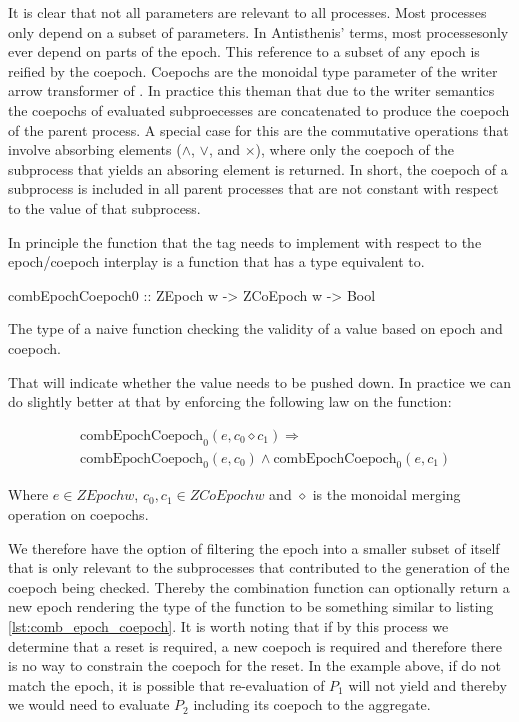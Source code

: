 It is clear that not all parameters are relevant to all processes.
Most processes only depend on a subset of parameters. In Antisthenis'
terms, most processesonly ever depend on parts of the epoch. This
reference to a subset of any epoch is reified by the coepoch. Coepochs
are the monoidal type parameter of the writer arrow transformer of
.  In practice this theman that due to the writer
semantics the coepochs of evaluated subproecesses are concatenated to
produce the coepoch of the parent process. A special case for this are
the commutative operations that involve absorbing elements (\(\land\),
\(\lor\), and \(\times\)), where only the coepoch of the subprocess
that yields an absoring element is returned. In short, the coepoch of
a subprocess is included in all parent processes that are not constant
with respect to the value of that subprocess.

In principle the function that the  tag needs to
implement with respect to the epoch/coepoch interplay is a function
that has a type equivalent to.

\begin{code}
\begin{haskellcode}
combEpochCoepoch0 :: ZEpoch w -> ZCoEpoch w -> Bool
\end{haskellcode}
  \caption{\label{sec:epochs_coepochs}The type of a naive function
    checking the validity of a value based on epoch and coepoch.}
\end{code}

That will indicate whether the value needs to be pushed down. In
practice we can do slightly better at that by enforcing the following
law on the  function:

\begin{align*}
& \text{combEpochCoepoch}_0(e, c_0 \diamond c_1) \Rightarrow \\
& \text{combEpochCoepoch}_0(e,c_0) \land \text{combEpochCoepoch}_0(e,c_1)
\end{align*}

Where \(e \in ZEpoch w\), \(c_0,c_1 \in ZCoEpoch w\) and \(\diamond\)
is the monoidal merging operation on coepochs.

We therefore have the option of filtering the epoch into a smaller
subset of itself that is only relevant to the subprocesses that
contributed to the generation of the coepoch being checked. Thereby
the combination function can optionally return a new epoch rendering
the type of the function to be something similar to listing
\ref{lst:comb_epoch_coepoch}. It is worth noting that if by this
process we determine that a reset is required, a new coepoch is
required and therefore there is no way to constrain the coepoch for
the reset. In the example above, if  do not
match the epoch, it is possible that re-evaluation of \(P_1\) will not
yield  and thereby we would need to evaluate \(P_2\)
including its coepoch to the aggregate.

